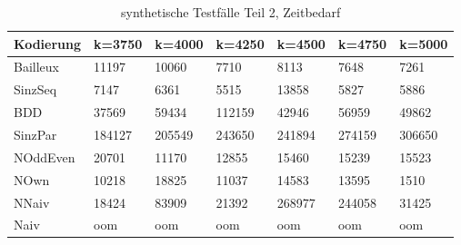 \documentclass[a4,abstract=on]{scrartcl}
\begin{document}
\begin{landscape}
\begin{adjustwidth*}{-4cm}{-3cm}
\begin{flushleft}
\begin{table}[h!]
    \small
    \setlength{\tabcolsep}{0.11cm}
     \centering
     \begin{tabular}[width=\textwidth]{|l|l|l|l|l|l|l|}
	\hline
       \textbf{Kodierung} &\textbf{k=3750} &\textbf{k=4000} &\textbf{k=4250} &\textbf{k=4500} &\textbf{k=4750} &\textbf{k=5000}\\
\hline
 Bailleux & 11197 & 10060 & 7710 & 8113 & 7648 & 7261\\
\hline
SinzSeq & 7147 & 6361 & 5515 & 13858 & 5827 & 5886\\
\hline
BDD & 37569 & 59434 & 112159 & 42946 & 56959 & 49862\\
\hline
SinzPar & 184127 & 205549 & 243650 & 241894 & 274159 &306650\\
\hline
NOddEven & 20701 & 11170 & 12855 & 15460 & 15239 & 15523\\
\hline
NOwn  & 10218 & 18825 & 11037 & 14583 & 13595 & 1510\\
\hline
NNaiv & 18424 & 83909 & 21392 & 268977 & 244058 & 31425\\
\hline
Naiv  & oom & oom & oom & oom & oom & oom\\
\hline

 \end{tabular}

     \caption{synthetische Testfälle Teil 2, Zeitbedarf}
     \label{tbl:beispieltabelle}

   \end{table}
	\end{flushleft}
\end{adjustwidth*}


\end{landscape}
\end{document}
